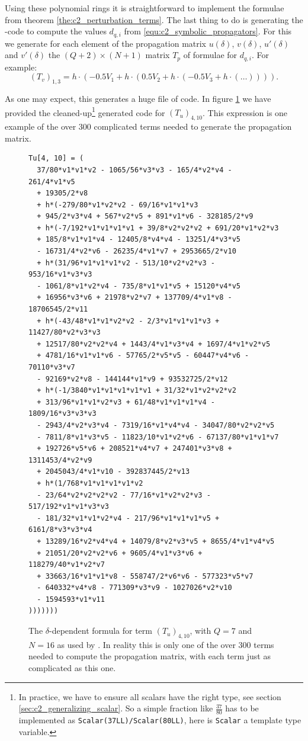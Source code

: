 Using these polynomial rings it is straightforward to implement the formulae from theorem \ref{the:c2_perturbation_terms}. The last thing to do is generating the \cpp{}-code to compute the values $d_{q,i}$ from \eqref{equ:c2_symbolic_propagators}. For this we generate for each element of the propagation matrix $u(\delta)$, $v(\delta)$, $u'(\delta)$ and $v'(\delta)$ the $(Q+2)\times (N+1)$ matrix $T_p$ of formulae for $d_{q,i}$. For example:
$$
    (T_v)_{1, 3} = h\cdot\left(-0.5 V_1 + h\cdot\left(0.5 V_2 + h\cdot\left(-0.5 V_3 + h\cdot\left(\dots\right)\right)\right)\right)\text{.}
$$

As one may expect, this generates a huge file of code. In figure \ref{fig:c2_generated_code} we have provided the cleaned-up\footnote{In practice, we have to ensure all scalars have the right type, see section \ref{sec:c2_generalizing_scalar}. So a simple fraction like $\frac{37}{80}$ has to be implemented as \texttt{Scalar(37LL)/Scalar(80LL)}, here is \texttt{Scalar} a template type variable.} generated code for $(T_u)_{4, 10}$. This expression is one example of the over $300$ complicated terms needed to generate the propagation matrix.

\begin{figure}
\begin{verbatim}
Tu[4, 10] = (
  37/80*v1*v1*v2 - 1065/56*v3*v3 - 165/4*v2*v4 - 261/4*v1*v5
  + 19305/2*v8
  + h*(-279/80*v1*v2*v2 - 69/16*v1*v1*v3
  + 945/2*v3*v4 + 567*v2*v5 + 891*v1*v6 - 328185/2*v9
  + h*(-7/192*v1*v1*v1*v1 + 39/8*v2*v2*v2 + 691/20*v1*v2*v3
  + 185/8*v1*v1*v4 - 12405/8*v4*v4 - 13251/4*v3*v5
  - 16731/4*v2*v6 - 26235/4*v1*v7 + 2953665/2*v10
  + h*(31/96*v1*v1*v1*v2 - 513/10*v2*v2*v3 - 953/16*v1*v3*v3
  - 1061/8*v1*v2*v4 - 735/8*v1*v1*v5 + 15120*v4*v5
  + 16956*v3*v6 + 21978*v2*v7 + 137709/4*v1*v8 - 18706545/2*v11
  + h*(-43/48*v1*v1*v2*v2 - 2/3*v1*v1*v1*v3 + 11427/80*v2*v3*v3
  + 12517/80*v2*v2*v4 + 1443/4*v1*v3*v4 + 1697/4*v1*v2*v5
  + 4781/16*v1*v1*v6 - 57765/2*v5*v5 - 60447*v4*v6 - 70110*v3*v7
  - 92169*v2*v8 - 144144*v1*v9 + 93532725/2*v12
  + h*(-1/3840*v1*v1*v1*v1*v1 + 31/32*v1*v2*v2*v2
  + 313/96*v1*v1*v2*v3 + 61/48*v1*v1*v1*v4 - 1809/16*v3*v3*v3
  - 2943/4*v2*v3*v4 - 7319/16*v1*v4*v4 - 34047/80*v2*v2*v5
  - 7811/8*v1*v3*v5 - 11823/10*v1*v2*v6 - 67137/80*v1*v1*v7
  + 192726*v5*v6 + 208521*v4*v7 + 247401*v3*v8 + 1311453/4*v2*v9
  + 2045043/4*v1*v10 - 392837445/2*v13
  + h*(1/768*v1*v1*v1*v1*v2
  - 23/64*v2*v2*v2*v2 - 77/16*v1*v2*v2*v3 - 517/192*v1*v1*v3*v3
  - 181/32*v1*v1*v2*v4 - 217/96*v1*v1*v1*v5 + 6161/8*v3*v3*v4
  + 13289/16*v2*v4*v4 + 14079/8*v2*v3*v5 + 8655/4*v1*v4*v5
  + 21051/20*v2*v2*v6 + 9605/4*v1*v3*v6 + 118279/40*v1*v2*v7
  + 33663/16*v1*v1*v8 - 558747/2*v6*v6 - 577323*v5*v7
  - 640332*v4*v8 - 771309*v3*v9 - 1027026*v2*v10
  - 1594593*v1*v11
)))))))
\end{verbatim}
\caption{The $\delta$-dependent formula for term $(T_u)_{4, 10}$, with $Q = 7$ and $N = 16$ as used by . In reality this is only one of the over $300$ terms needed to compute the propagation matrix, with each term just as complicated as this one.}\label{fig:c2_generated_code}
\end{figure}

